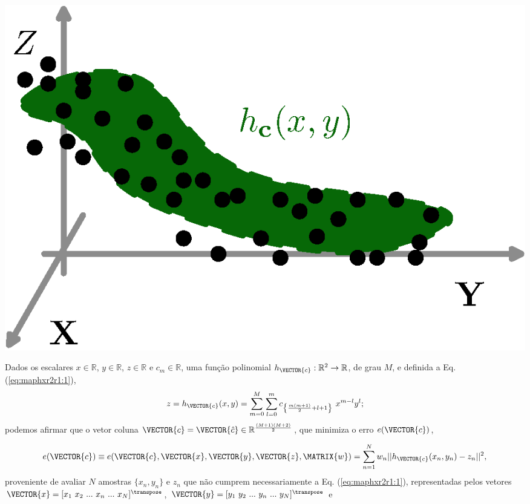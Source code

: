 \begin{theorem}
\label{theo:maphxr2r1}
~\\
\begin{minipage}{0.4\textwidth}
\centering
\includegraphics[width=0.95\linewidth]{chapters/mapeamento/mapeamento-hx2.eps} 
\end{minipage}
\begin{minipage}{0.6\textwidth}
Dados
os escalares $x \in \mathbb{R}$, $y \in \mathbb{R}$, $z \in \mathbb{R}$ e $c_m \in \mathbb{R}$,
uma função polinomial $h_{\VECTOR{c}}:\mathbb{R}^2 \rightarrow \mathbb{R}$, de grau $M$, e 
definida a Eq. (\ref{eq:maphxr2r1:1}),
\begin{equation}\label{eq:maphxr2r1:1}
z= h_{\VECTOR{c}}(x,y) = \sum \limits_{m=0}^{M} \sum \limits_{l=0}^{m}c_{\left\{ \frac{m(m+1)}{2}+l+1\right\}}~x^{m-l}y^{l}; 
\end{equation}
podemos afirmar que o vetor coluna $\VECTOR{c}=\VECTOR{\hat{c}} \in \mathbb{R}^{\frac{(M+1)(M+2)}{2}}$,
que minimiza o erro $e(\VECTOR{c})$,
\end{minipage}
\begin{equation}\label{eq:maphxr2r1:2}
e(\VECTOR{c}) \equiv e(\VECTOR{c},\VECTOR{x},\VECTOR{y},\VECTOR{z},\MATRIX{w})=  \sum_{n=1}^{N} w_n||h_{\VECTOR{c}}(x_n,y_n)-z_n||^2,
\end{equation}
proveniente de avaliar $N$ amostras $\{x_n,y_n\}$ e $z_n$ que não cumprem necessariamente a Eq. (\ref{eq:maphxr2r1:1}), 
representadas pelos vetores 
$\VECTOR{x}=[x_1~ x_2~ ...~ x_n~ ...~ x_N]^{\transpose}$,
$\VECTOR{y}=[y_1~ y_2~ ...~ y_n~ ...~ y_N]^{\transpose}$ e 

\end{theorem}
